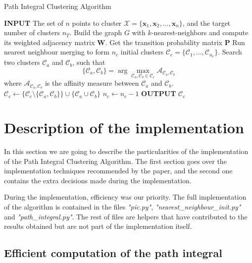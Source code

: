 \documentclass[
	10pt,
	parskip=half-,	
	paper=a4,
	english
	]{scrartcl}
\begin{document}
\begin{algorithm}
\caption{Path Integral Clustering Algorithm}
\begin{algorithmic}[1]
    \State \textbf{INPUT} The set of $n$ points to cluster $\mathcal{X} = \{\mathbf{x}_1, \mathbf{x}_2, \dots, \mathbf{x}_n\}$, and the target number of clusters $n_T$.
    \State Build the graph $G$ with $k$-nearest-neighbors and compute its weighted adjacency matrix $\mathbf{W}$.
    \State Get the transition probability matrix $\mathbf{P}$
    \State Run nearest neighbour merging to form $n_c$ initial clusters $\mathcal{C}_c = \{\mathcal{C}_1, \ldots, \mathcal{C}_{n_c}\}$.
        \State Search two clusters $\mathcal{C}_a$ and $\mathcal{C}_b$, such that 
        \[
        \{\mathcal{C}_a, \mathcal{C}_b\} = \arg\max_{\mathcal{C}_a, \mathcal{C}_b \in \mathcal{C}_c} \mathcal{A}_{\mathcal{C}_a, \mathcal{C}_b}
        \]
        where $\mathcal{A}_{\mathcal{C}_a, \mathcal{C}_b}$ is the affinity measure between $\mathcal{C}_a$ and $\mathcal{C}_b$.
        \State $\mathcal{C}_c \leftarrow \{\mathcal{C}_c \setminus \{\mathcal{C}_a, \mathcal{C}_b\} \} \cup \{\mathcal{C}_a \cup \mathcal{C}_b\}$
        \State $n_c \leftarrow n_c - 1$
    \EndWhile
    \State \textbf{OUTPUT} $\mathcal{C}_c$
\end{algorithmic}
\label{algorithmpseudo}
\end{algorithm}

\newpage
\section {Description of the implementation}

In this section we are going to describe the particularities of the implementation of the Path Integral Clustering Algorithm. The first section goes over the implementation techniques recommended by the paper, and the second one contains the extra decisions made during the implementation. 

During the implementation, efficiency was our priority. The full implementation of the algorithm is contained in the files \textit{"pic.py"}, \textit{"nearest\_neighbour\_init.py"} and \textit{"path\_integral.py"}. The rest of files are helpers that have contributed to the results obtained but are not part of the implementation itself.

\subsection{Efficient computation of the path integral}
\end{document}
